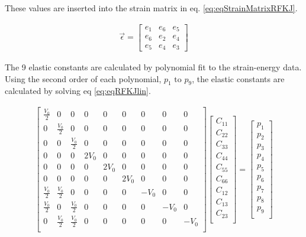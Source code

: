 These values are inserted into the strain matrix in eq. \ref{eq:eqStrainMatrixRFKJ}.

\begin{equation}
\begin{split}
\vec{\epsilon} = \begin{bmatrix} e_1 & e_6 & e_5 \\ e_6 & e_2 & e_4 \\ e_5 & e_4 & e_3 \end{bmatrix}
\end{split}
\label{eq:eqStrainMatrixRFKJ}
\end{equation}

The 9 elastic constants are calculated by polynomial fit to the strain-energy data.  Using the second order of each polynomial, $p_1 \text{ to } p_9$, the elastic constants are calculated by solving eq \ref{eq:eqRFKJlin}. 

\begin{equation}
\begin{split}
	\begin{bmatrix} 
   \frac{V_0}{2} & 0 & 0 & 0 & 0 & 0 & 0 & 0 & 0 \\ 
   0 & \frac{V_0}{2} & 0 & 0 & 0 & 0 & 0 & 0 & 0 \\ 
   0 & 0 & \frac{V_0}{2} & 0 & 0 & 0 & 0 & 0 & 0 \\ 
   0 & 0 & 0 & 2V_0 & 0 & 0 & 0 & 0 & 0 \\ 
   0 & 0 & 0 & 0 & 2V_0 & 0 & 0 & 0 & 0 \\ 
   0 & 0 & 0 & 0 & 0 & 2V_0 & 0 & 0 & 0 \\ 
   \frac{V_0}{2} & \frac{V_0}{2} & 0 & 0 & 0 & 0 & -V_0 & 0 & 0 \\ 
   \frac{V_0}{2} & 0 & \frac{V_0}{2} & 0 & 0 & 0 & 0 & -V_0 & 0 \\ 
   0 & \frac{V_0}{2} & \frac{V_0}{2} & 0 & 0 & 0 & 0 & 0 & -V_0 \\ 
\end{bmatrix} 
\begin{bmatrix} 
C_{11} \\ 
C_{22} \\ 
C_{33} \\ 
C_{44} \\ 
C_{55} \\ 
C_{66} \\ 
C_{12} \\ 
C_{13} \\ 
C_{23} \\  
\end{bmatrix} = 
\begin{bmatrix} 
p_{1} \\ 
p_{2} \\ 
p_{3} \\ 
p_{4} \\ 
p_{5} \\ 
p_{6} \\ 
p_{7} \\ 
p_{8} \\ 
p_{9} \\  
\end{bmatrix}
\end{split}
\label{eq:eqRFKJlin}
\end{equation}



